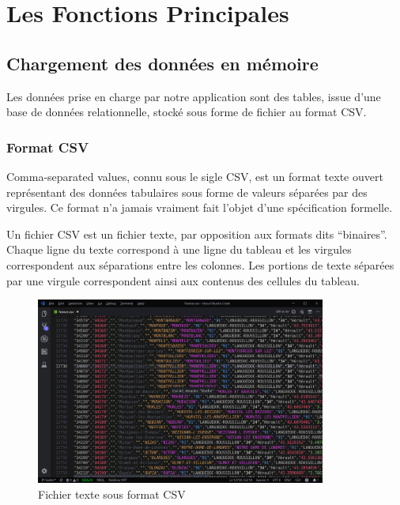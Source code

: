 \documentclass[oneside,13pt,a4paper]{report}
\begin{document}
\section{Les Fonctions Principales}

\subsection{Chargement des données en mémoire}

Les données prise en charge par notre application sont des tables, issue d'une base de données relationnelle, stocké sous forme de fichier au format CSV.

\subsubsection{Format CSV}
\label{csv}
Comma-separated values, connu sous le sigle CSV, est un format texte ouvert %
représentant des données tabulaires sous forme de valeurs séparées par des virgules.
Ce format n'a jamais vraiment fait l'objet d'une spécification formelle.

Un fichier CSV est un fichier texte, par opposition aux formats dits \enquote{binaires}.
Chaque ligne du texte correspond à une ligne du tableau et les virgules correspondent aux séparations entre les colonnes.
Les portions de texte séparées par une virgule correspondent ainsi aux contenus des cellules du tableau.

\begin{figure}[!h]
	\centering
	\includegraphics[width=0.85\textwidth]{img/csv.png}
	\caption{Fichier texte sous format CSV}
\end{figure}
\end{document}
